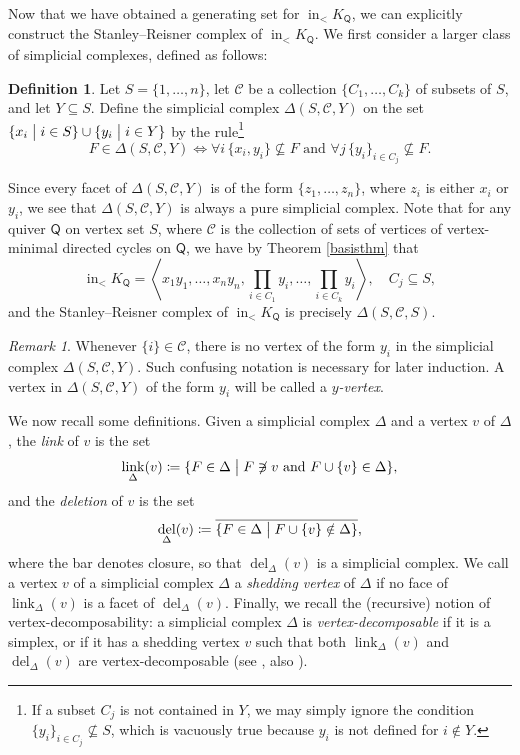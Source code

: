 \documentclass[10pt]{amsart}
\numberwithin{equation}{section}
\theoremstyle{definition}
\newtheorem{defn}[thm]{Definition}
\theoremstyle{remark}
\newtheorem{rem}[thm]{Remark}
\newcommand{\st}{\bigm\vert}
\newcommand{\sC}{\mathscr{C}}
\DeclareMathOperator{\del}{\mathrm{del}}
\DeclareMathOperator{\In}{\mathrm{in}}
\DeclareMathOperator{\link}{\mathrm{link}}
\newcommand{\1}{^{-1}}
\newcommand{\la}{\langle}
\newcommand{\ra}{\rangle}
\def\Q{\mathsf{Q}}
\begin{document}
\noindent
Now that we have obtained a generating set for $\In_< K_{\Q}$, we can explicitly construct the Stanley--Reisner complex of $\In_< K_{\Q}$. We first consider a larger class of simplicial complexes, defined as follows:
\begin{defn}
Let $S = \{1,\dots,n\}$, let $\sC$ be a collection $\{C_1,\dots,C_k\}$ of subsets of $S$, and let $Y \subseteq S$.  Define the simplicial complex $\Delta(S,\sC,Y)$ on the set $\{x_i \st i \in S\} \cup \{y_i \st i \in Y\}$ by the rule\footnote{If a subset $C_j$ is not contained in $Y$, we may simply ignore the condition $\{y_i\}_{i\in C_j} \not\subseteq S$, which is vacuously true because $y_i$ is not defined for $i\not\in Y$.}
\[
F \in \Delta(S,\sC,Y) \iff \forall i \, \{x_i,y_i\} \not \subseteq F \text{ and } \forall j \, \{y_i\}_{i \in C_j} \not \subseteq F.
\]
\end{defn}
Since every facet of $\Delta(S,\sC,Y)$ is of the form $\{z_1,\dots,z_n\}$, where $z_i$ is either $x_i$ or $y_i$, we see that $\Delta(S,\sC,Y)$ is always a pure simplicial complex. Note that for any quiver $\Q$ on vertex set $S$, where $\sC$ is the collection of sets of vertices of vertex-minimal directed cycles on $\Q$, we have by Theorem \ref{basisthm} that
\begin{equation}\label{idealform}
\In_< K_{\mathsf Q} = \left \la x_1y_1,\dots,x_ny_n, \prod_{i \in C_1}y_i,\dots,\prod_{i \in C_k}y_i \right \ra, \quad C_j \subseteq S,
\end{equation}
and the Stanley--Reisner complex of $\In_< K_{\mathsf Q}$ is precisely $\Delta(S,\sC,S)$.  

\begin{rem}
Whenever $\{i\}\in \sC$, there is no vertex of the form $y_i$ in the simplicial complex $\Delta(S,\sC,Y)$.  Such confusing notation is necessary for later induction.  A vertex in $\Delta(S,\sC,Y)$ of the form $y_i$ will be called a \textit{$y$-vertex}.
\end{rem}

We now recall some definitions.
Given a simplicial complex $\Delta$ and a vertex $v$ of $\Delta$, the \textit{link} of $v$ is the set
\[\link_\Delta(v) \coloneqq \{F \in \Delta \st F \not\ni v \text{ and } F \cup \{v\} \in \Delta\},
\]
and the \textit{deletion} of $v$ is the set
\[
\del_{\Delta}(v) \coloneqq \overline{\{F \in \Delta \st F \cup \{v\} \notin \Delta\}},
\]
where the bar denotes closure, so that $\del_{\Delta}(v)$ is a simplicial complex. 
We call a vertex $v$ of a simplicial complex $\Delta$ a \textit{shedding vertex} of $\Delta$ if no face of $\link_\Delta(v)$ is a facet of $\del_\Delta(v)$. Finally, we recall the (recursive) notion of vertex-decomposability: a simplicial complex $\Delta$ is \textit{vertex-decomposable} if it is a simplex, or if it has a shedding vertex $v$ such that both $\link_\Delta(v)$ and $\del_\Delta(v)$ are vertex-decomposable (see \cite{BilleraProvan}, also \cite{BjornerWachs}). %
\end{document}
